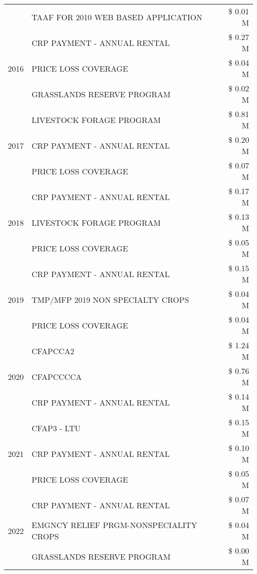 \begin{tabular}{llr}
 & TAAF FOR 2010 WEB BASED APPLICATION & \$ 0.01 M \\
\cline{1-3}
\multirow[t]{3}{*}{2016} & CRP PAYMENT - ANNUAL RENTAL & \$ 0.27 M \\
 & PRICE LOSS COVERAGE & \$ 0.04 M \\
 & GRASSLANDS RESERVE PROGRAM & \$ 0.02 M \\
\cline{1-3}
\multirow[t]{3}{*}{2017} & LIVESTOCK FORAGE PROGRAM & \$ 0.81 M \\
 & CRP PAYMENT - ANNUAL RENTAL & \$ 0.20 M \\
 & PRICE LOSS COVERAGE & \$ 0.07 M \\
\cline{1-3}
\multirow[t]{3}{*}{2018} & CRP PAYMENT - ANNUAL RENTAL & \$ 0.17 M \\
 & LIVESTOCK FORAGE PROGRAM & \$ 0.13 M \\
 & PRICE LOSS COVERAGE & \$ 0.05 M \\
\cline{1-3}
\multirow[t]{3}{*}{2019} & CRP PAYMENT - ANNUAL RENTAL & \$ 0.15 M \\
 & TMP/MFP 2019 NON SPECIALTY CROPS & \$ 0.04 M \\
 & PRICE LOSS COVERAGE & \$ 0.04 M \\
\cline{1-3}
\multirow[t]{3}{*}{2020} & CFAPCCA2 & \$ 1.24 M \\
 & CFAPCCCCA & \$ 0.76 M \\
 & CRP PAYMENT - ANNUAL RENTAL & \$ 0.14 M \\
\cline{1-3}
\multirow[t]{3}{*}{2021} & CFAP3 - LTU & \$ 0.15 M \\
 & CRP PAYMENT - ANNUAL RENTAL & \$ 0.10 M \\
 & PRICE LOSS COVERAGE & \$ 0.05 M \\
\cline{1-3}
\multirow[t]{3}{*}{2022} & CRP PAYMENT - ANNUAL RENTAL & \$ 0.07 M \\
 & EMGNCY RELIEF PRGM-NONSPECIALITY CROPS & \$ 0.04 M \\
 & GRASSLANDS RESERVE PROGRAM & \$ 0.00 M \\
\cline{1-3}
\bottomrule
\end{tabular}
